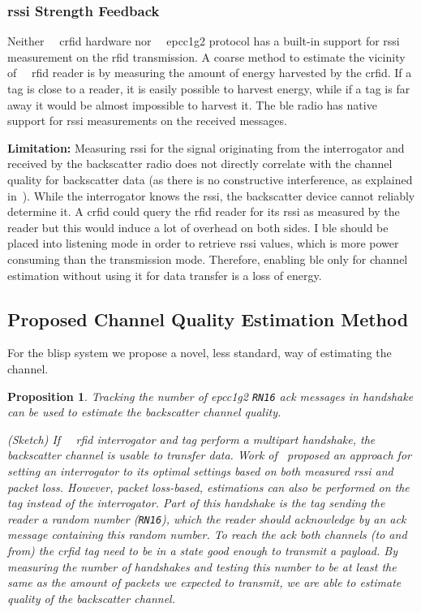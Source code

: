 \documentclass[conference,letterpaper,twoside,final,10pt]{IEEEtran}
\newtheorem{proposition}{Proposition}
\begin{document}
\subsubsection{\acs{rssi} Strength Feedback}
\label{sec:feedback/rssi}

Neither {~~}\ac{crfid} hardware nor {~~}\ac{epcc1g2} protocol has a built-in support for \ac{rssi} measurement on the \ac{rfid} transmission.
A coarse method to estimate the vicinity of {~~}\ac{rfid} reader is by measuring the amount of energy harvested by the \ac{crfid}.
If a tag is close to a reader, it is easily possible to harvest energy, while if a tag is far away it would be almost impossible to harvest it.
The \ac{ble} radio has native support for \ac{rssi} measurements on the received messages.

\textbf{Limitation:}
Measuring \ac{rssi} for the signal originating from the interrogator and received by the backscatter radio does not directly correlate with the channel quality for backscatter data (as there is no constructive interference, as explained in~).
While the interrogator knows the \ac{rssi}, the backscatter device cannot reliably determine it.
A \ac{crfid} could query the \ac{rfid} reader for its \ac{rssi} as measured by the reader but this would induce a lot of overhead on both sides. 
I
\ac{ble} should be placed into listening mode in order to retrieve \ac{rssi} values, which is more power consuming than the transmission mode.
Therefore, enabling \ac{ble} only for channel estimation without using it for data transfer is a loss of energy.

\subsection{Proposed Channel Quality Estimation Method}
\label{sec:feedforward}

For the \acs{blisp} system we propose a novel, less standard, way of estimating the channel.
\begin{proposition}
Tracking the number of \ac{epcc1g2} \texttt{RN16} \ac{ack} messages in handshake can be used to estimate the backscatter channel quality.
\begin{IEEEproof}
(Sketch) If {~~}\ac{rfid} interrogator and tag perform a multipart handshake, the backscatter channel is usable to transfer data.
Work of~\cite{zhang2012mobisys} proposed an approach for setting an interrogator to its optimal settings based on both measured \ac{rssi} and packet loss.
However, packet loss-based, estimations can also be performed on the tag instead of the interrogator.
Part of this handshake is the tag sending the reader a random number (\texttt{RN16}), which the reader should acknowledge by an \ac{ack} message containing this random number.
To reach the \ac{ack} both channels (to and from) the \ac{crfid} tag need to be in a state good enough to transmit a payload.
By measuring the number of handshakes and testing this number to be at least the same as the amount of packets we expected to transmit, we are able to estimate quality of the backscatter channel.
\end{IEEEproof}
\end{proposition}
\end{document}
